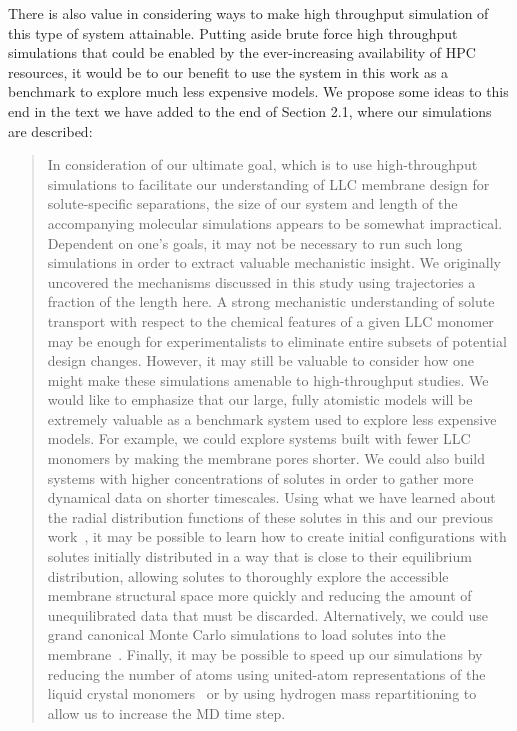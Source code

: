 \documentclass{article}
\begin{document}
\begin{enumerate}[label={Comment \theenumi :}, leftmargin=3.9\parindent]
    There is also value in considering ways to make high throughput simulation of this type of 
    system attainable. Putting aside brute force high throughput simulations that could be enabled 
    by the ever-increasing availability of HPC resources, it would be to our benefit to use the
    system in this work as a benchmark to explore much less expensive models. We propose some ideas
    to this end in the text we have added to the end of Section 2.1, where our simulations are described:
    \begin{quote}
    In consideration of our ultimate goal, which is to use high-throughput simulations to 
    facilitate our understanding of LLC membrane design for solute-specific separations, the size 
    of our system and length of the accompanying molecular simulations appears to be somewhat 
    impractical. Dependent on one's goals, it may not be necessary to run such long simulations in order 
    to extract valuable mechanistic insight. We originally uncovered the mechanisms discussed
    in this study using trajectories a fraction of the length here.\cite{coscia_chemically_2019} A 
    strong mechanistic understanding of solute transport with respect to the chemical features of a 
    given LLC monomer may be enough for experimentalists to eliminate entire subsets of potential
    design changes. However, it may still be valuable to consider how one might make these simulations
    amenable to high-throughput studies. We would like to emphasize that our large, fully atomistic 
    models will be extremely valuable as a benchmark system used to explore less expensive models. 
    For example, we could explore systems built with fewer LLC monomers by making the membrane pores
    shorter. We could also build systems with higher concentrations of solutes in order to gather more 
    dynamical data on shorter timescales. Using what we have learned about the radial distribution
    functions of these solutes in this and our previous work~\cite{coscia_chemically_2019}, it may be possible to 
    learn how to create initial configurations with solutes initially distributed in a way that
    is close to their equilibrium distribution, allowing solutes to thoroughly explore the 
    accessible membrane structural space more quickly and reducing the amount of unequilibrated
    data that must be discarded. Alternatively, we could use grand canonical Monte Carlo simulations
    to load solutes into the membrane~\cite{snurr_prediction_1993}. Finally, it may be possible 
    to speed up our simulations by reducing the number of atoms using united-atom representations
    of the liquid crystal monomers~\cite{horta_gromos-compatible_2016} or by using hydrogen mass 
    repartitioning to allow us to increase the MD time step.~\cite{hopkins_long-time-step_2015}
    \end{quote}
    

\end{enumerate}
\end{document}
